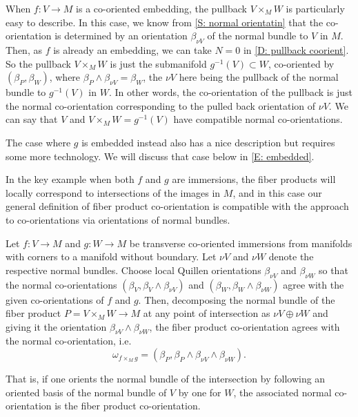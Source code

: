 \begin{example}\label{E: V embedded}
	When $f \colon V \to M$ is a co-oriented embedding, the pullback $V \times_M W$ is particularly easy to describe.
	In this case, we know from \cref{S: normal orientatin} that the co-orientation is determined by an orientation $\beta_{\nu V}$ of the normal bundle to $V$ in $M$.
	Then, as $f$ is already an embedding, we can take $N = 0$ in \cref{D: pullback coorient}.
	So the pullback $V \times_M W$ is just the submanifold $g^{-1}(V) \subset W$, co-oriented by $(\beta_P,\beta_W)$, where $\beta_P \wedge \beta_{\nu V} = \beta_W$, the $\nu V$ here being the pullback of the normal bundle to $g^{-1}(V)$ in $W$.
	In other words, the co-orientation of the pullback is just the normal co-orientation corresponding to the pulled back orientation of $\nu V$.
	We can say that $V$ and $V \times_M W = g^{-1}(V)$ have compatible normal co-orientations.

	The case where $g$ is embedded instead also has a nice description but requires some more technology.
	We will discuss that case below in \cref{E: embedded}.
\end{example}

In the key example when both $f$ and $g$ are immersions, the fiber products will locally correspond to intersections of the images in $M$, and in this case our general definition of fiber product co-orientation is compatible with the approach to co-orientations via orientations of normal bundles.

\begin{proposition}\label{P: normal pullback}
	Let $f \colon V \to M$ and $g \colon W \to M$ be transverse co-oriented immersions from manifolds with corners to a manifold without boundary.
	Let $\nu V$ and $\nu W$ denote the respective normal bundles.
	Choose local Quillen orientations $\beta_{\nu V}$ and $\beta_{\nu W}$ so that the normal co-orientations $(\beta_V, \beta_V \wedge \beta_{\nu V})$ and $(\beta_W, \beta_W \wedge \beta_{\nu W})$ agree with the given co-orientations of $f$ and $g$.
	Then, decomposing the normal bundle of the fiber product $P = V \times_M W \to M$ at any point of intersection as $\nu V \oplus \nu W$ and giving it the orientation $\beta_{\nu V} \wedge \beta_{\nu W}$, the fiber product co-orientation agrees with the normal co-orientation, i.e.\
	$$\omega_{f \times_M g} = (\beta_P,\beta_P \wedge \beta_{\nu V} \wedge \beta_{\nu W}).$$
\end{proposition}

That is, if one orients the normal bundle of the intersection by following an oriented basis of the normal bundle of $V$ by one for $W$, the associated normal co-orientation is the fiber product co-orientation.

